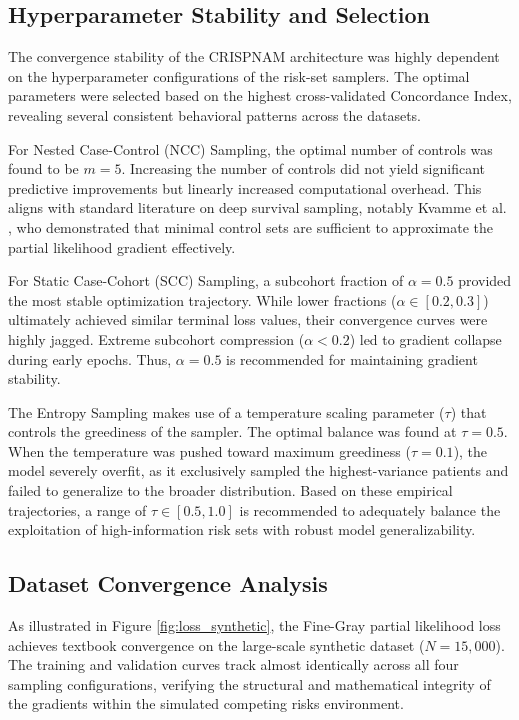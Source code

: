 \documentclass[a4paper,twoside,12pt]{report}
\begin{document}
\subsection{Hyperparameter Stability and Selection}

The convergence stability of the CRISPNAM architecture was highly dependent on the hyperparameter configurations of the risk-set samplers. The optimal parameters were selected based on the highest cross-validated Concordance Index, revealing several consistent behavioral patterns across the datasets.

For Nested Case-Control (NCC) Sampling, the optimal number of controls was found to be $m = 5$. Increasing the number of controls did not yield significant predictive improvements but linearly increased computational overhead. This aligns with standard literature on deep survival sampling, notably Kvamme et al. \citep{kvamme2019}, who demonstrated that minimal control sets are sufficient to approximate the partial likelihood gradient effectively.

For Static Case-Cohort (SCC) Sampling, a subcohort fraction of $\alpha = 0.5$ provided the most stable optimization trajectory. While lower fractions ($\alpha \in [0.2, 0.3]$) ultimately achieved similar terminal loss values, their convergence curves were highly jagged. Extreme subcohort compression ($\alpha < 0.2$) led to gradient collapse during early epochs. Thus, $\alpha = 0.5$ is recommended for maintaining gradient stability.

The Entropy Sampling makes use of a temperature scaling parameter ($\tau$) that controls the greediness of the sampler. The optimal balance was found at $\tau = 0.5$. When the temperature was pushed toward maximum greediness ($\tau = 0.1$), the model severely overfit, as it exclusively sampled the highest-variance patients and failed to generalize to the broader distribution. Based on these empirical trajectories, a range of $\tau \in [0.5, 1.0]$ is recommended to adequately balance the exploitation of high-information risk sets with robust model generalizability.

\newpage

\subsection{Dataset Convergence Analysis}

As illustrated in Figure \ref{fig:loss_synthetic}, the Fine-Gray partial likelihood loss achieves textbook convergence on the large-scale synthetic dataset ($N=15,000$). The training and validation curves track almost identically across all four sampling configurations, verifying the structural and mathematical integrity of the gradients within the simulated competing risks environment. 
\end{document}
